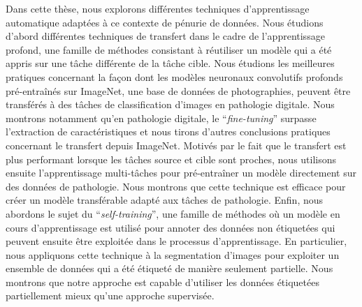 Dans cette thèse, nous explorons différentes techniques d'apprentissage automatique adaptées à ce contexte de pénurie de données. Nous étudions d'abord différentes techniques de transfert dans le cadre de l'apprentissage profond, une famille de méthodes consistant à réutiliser un modèle qui a été appris sur une tâche différente de la tâche cible. Nous étudions les meilleures pratiques concernant la façon dont les modèles neuronaux convolutifs profonds pré-entraînés sur ImageNet, une base de données de photographies, peuvent être transférés à des tâches de classification d'images en pathologie digitale. Nous montrons notamment qu'en pathologie digitale, le ``\textit{fine-tuning}'' surpasse l'extraction de caractéristiques et nous tirons d'autres conclusions pratiques concernant le transfert depuis ImageNet. Motivés par le fait que le transfert est plus performant lorsque les tâches source et cible sont proches, nous utilisons ensuite l'apprentissage multi-tâches pour pré-entraîner un modèle directement sur des données de pathologie. Nous montrons que cette technique est efficace pour créer un modèle transférable adapté aux tâches de pathologie. Enfin, nous abordons le sujet du ``\textit{self-training}'', une famille de méthodes où un modèle en cours d'apprentissage est utilisé pour annoter des données non étiquetées qui peuvent ensuite être exploitée dans le processus d'apprentissage. En particulier, nous appliquons cette technique à la segmentation d'images pour exploiter un ensemble de données qui a été étiqueté de manière seulement partielle. Nous montrons que notre approche est capable d'utiliser les données étiquetées partiellement mieux qu'une approche supervisée.
